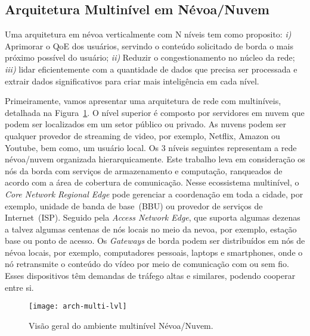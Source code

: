 \subsection{Arquitetura Multinível em Névoa/Nuvem}


Uma arquitetura em névoa verticalmente com N níveis tem como proposito: 
\textit{i)} Aprimorar o QoE dos usuários, servindo o conteúdo solicitado de borda o mais próximo possível do usuário;
\textit{ii)} Reduzir o congestionamento no núcleo da rede;
\textit{iii)} lidar eficientemente com a quantidade de dados que precisa ser processada e extrair dados significativos para criar mais inteligência em cada nível. 
%

Primeiramente, vamos apresentar uma arquitetura de rede com multiníveis, detalhada na Figura~\ref{fig:arch-multi-lvl}. O nível superior é composto por servidores em nuvem que podem ser localizados em um setor público ou privado. As nuvens podem ser qualquer provedor de streaming de video, por exemplo, Netflix, Amazon ou Youtube, bem como, um usuário local. %
Os 3 níveis seguintes representam a rede névoa/nuvem organizada hierarquicamente. Este  trabalho leva em consideração os nós da borda com serviços de armazenamento e computação, ranqueados de acordo com a área de cobertura de comunicação. Nesse ecossistema multinível, o \textit{Core Network Regional Edge} pode gerenciar a coordenação em toda a cidade, por exemplo, unidade de banda de base~(BBU) ou provedor de serviços de Internet~(ISP). Seguido pela \textit{Access Network Edge}, que suporta algumas dezenas a talvez algumas centenas de nós locais no meio da nevoa, por exemplo, estação base ou ponto de acesso. Os \textit{Gateways} de borda podem ser distribuídos em nós de névoa locais, por exemplo, computadores pessoais, laptops e smartphones, onde o nó retransmite o conteúdo do vídeo por meio de comunicação com ou sem fio. Esses dispositivos têm demandas de tráfego altas e similares, podendo cooperar entre si.%
\vspace{0.8cm}
\begin{figure}[htb]
  \centering
  \texttt{[image: arch-multi-lvl]}
  \caption{Visão geral do ambiente multinível Névoa/Nuvem.}
  \label{fig:arch-multi-lvl}
\end{figure}

